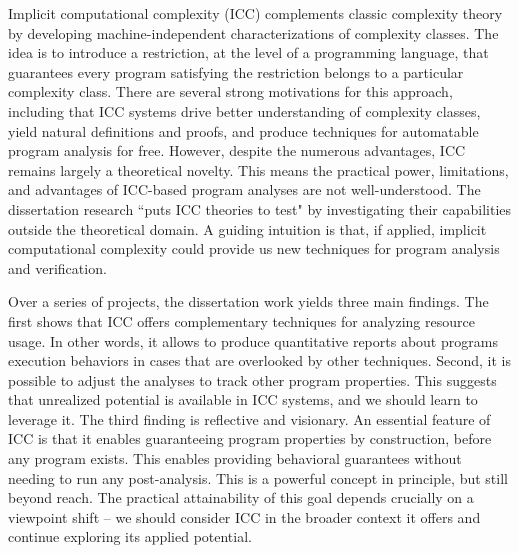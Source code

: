 Implicit computational complexity (ICC) complements classic complexity theory by developing machine-independent characterizations of complexity classes. The idea is to introduce a restriction, at the level of a programming language, that guarantees every program satisfying the restriction belongs to a particular complexity class. There are several strong motivations for this approach, including that ICC systems drive better understanding of complexity classes, yield natural definitions and proofs, and produce techniques for automatable program analysis for free. However, despite the numerous advantages, ICC remains largely a theoretical novelty. This means the practical power, limitations, and advantages of ICC-based program analyses are not well-understood. The dissertation research ``puts ICC theories to test" by investigating their capabilities outside the theoretical domain. A guiding intuition is that, if applied, implicit computational complexity could provide us new techniques for program analysis and verification.

Over a series of projects, the dissertation work yields three main findings. The first shows that ICC offers complementary techniques for analyzing resource usage. In other words, it allows to produce quantitative reports about programs execution behaviors in cases that are overlooked by other techniques. Second, it is possible to adjust the analyses to track other program properties. This suggests that unrealized potential is available in ICC systems, and we should learn to leverage it. The third finding is reflective and visionary. An essential feature of ICC is that it enables guaranteeing program properties by construction, before any program exists. This enables providing behavioral guarantees without needing to run any post-analysis. This is a powerful concept in principle, but still beyond reach. The practical attainability of this goal depends crucially on a viewpoint shift -- we should consider ICC in the broader context it offers and continue exploring its applied potential.